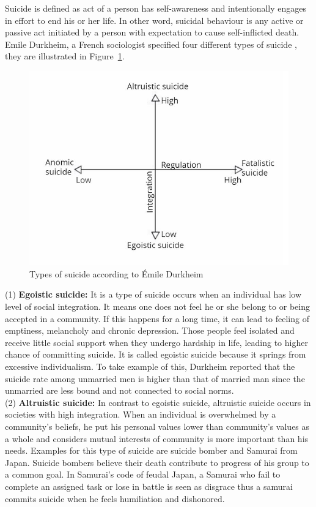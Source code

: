 Suicide is defined as act of a person has self-awareness and intentionally engages in effort to end his or her life. In other word, suicidal behaviour is any active or passive act initiated by a person with expectation to cause self-inflicted death. Emile Durkheim, a French sociologist specified four different types of suicide \cite{Durkheim1897}, they are illustrated in Figure~\ref{fig:types_of_suicide}.\\
\begin{figure}[!ht]
\centering
\includegraphics[width=\textwidth, clip=true]{img/type_suicide}
\caption[Types of suicide]{Types of suicide according to Émile Durkheim} 
\label{fig:types_of_suicide}
\end{figure}
(1) \textbf{Egoistic suicide:} It is a type of suicide occurs when an individual has low level of social integration. It means one does not feel he or she belong to or being accepted in a community. If this happens for a long time, it can lead to feeling of emptiness, melancholy and chronic depression. Those people feel isolated and receive little social support when they undergo hardship in life, leading to higher chance of committing suicide. It is called egoistic suicide because it springs from excessive individualism. To take example of this, Durkheim reported that the suicide rate among unmarried men is higher than that of married man since the unmarried are less bound and not connected to social norms.\\
(2) \textbf{Altruistic suicide:} In contrast to egoistic suicide, altruistic suicide occurs in societies with high integration. When an individual is overwhelmed by a community's beliefs, he put his personal values lower than community's values as a whole and considers mutual interests of community is more important than his needs. Examples for this type of suicide are suicide bomber and Samurai from Japan. Suicide bombers believe their death contribute to progress of his group to a common goal. In Samurai's code of feudal Japan, a Samurai who fail to complete an assigned task or lose in battle is seen as disgrace thus a samurai commits suicide when he feels humiliation and dishonored.\\
